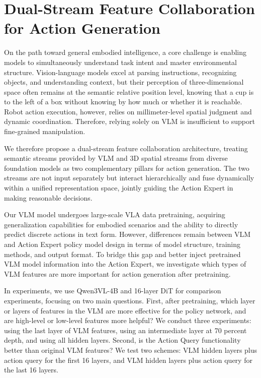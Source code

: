 \documentclass[11pt,a4paper]{article}
\begin{document}
\section{Dual-Stream Feature Collaboration for Action Generation}

On the path toward general embodied intelligence, a core challenge is enabling models to simultaneously understand task intent and master environmental structure. Vision-language models excel at parsing instructions, recognizing objects, and understanding context, but their perception of three-dimensional space often remains at the semantic relative position level, knowing that a cup is to the left of a box without knowing by how much or whether it is reachable. Robot action execution, however, relies on millimeter-level spatial judgment and dynamic coordination. Therefore, relying solely on VLM is insufficient to support fine-grained manipulation.

We therefore propose a dual-stream feature collaboration architecture, treating semantic streams provided by VLM and 3D spatial streams from diverse foundation models as two complementary pillars for action generation. The two streams are not input separately but interact hierarchically and fuse dynamically within a unified representation space, jointly guiding the Action Expert in making reasonable decisions.

Our VLM model undergoes large-scale VLA data pretraining, acquiring generalization capabilities for embodied scenarios and the ability to directly predict discrete actions in text form. However, differences remain between VLM and Action Expert policy model design in terms of model structure, training methods, and output format. To bridge this gap and better inject pretrained VLM model information into the Action Expert, we investigate which types of VLM features are more important for action generation after pretraining.

In experiments, we use Qwen3VL-4B and 16-layer DiT for comparison experiments, focusing on two main questions. First, after pretraining, which layer or layers of features in the VLM are more effective for the policy network, and are high-level or low-level features more helpful? We conduct three experiments: using the last layer of VLM features, using an intermediate layer at 70 percent depth, and using all hidden layers. Second, is the Action Query functionality better than original VLM features? We test two schemes: VLM hidden layers plus action query for the first 16 layers, and VLM hidden layers plus action query for the last 16 layers.
\end{document}
